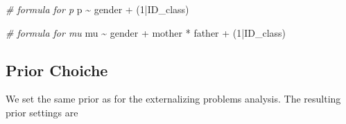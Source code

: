 \documentclass[
]{book}
\newenvironment{Shaded}{\begin{snugshade}}{\end{snugshade}}
\newcommand{\CommentTok}[1]{\textcolor[rgb]{0.56,0.35,0.01}{\textit{#1}}}
\newcommand{\DecValTok}[1]{\textcolor[rgb]{0.00,0.00,0.81}{#1}}
\newcommand{\NormalTok}[1]{#1}
\newcommand{\SpecialCharTok}[1]{\textcolor[rgb]{0.00,0.00,0.00}{#1}}
\begin{document}
\begin{Shaded}
\begin{Highlighting}[]
\CommentTok{\# formula for p}
\NormalTok{p }\SpecialCharTok{\textasciitilde{}}\NormalTok{ gender }\SpecialCharTok{+}\NormalTok{ (}\DecValTok{1}\SpecialCharTok{|}\NormalTok{ID\_class)}

\CommentTok{\# formula for mu}
\NormalTok{mu }\SpecialCharTok{\textasciitilde{}}\NormalTok{ gender }\SpecialCharTok{+}\NormalTok{ mother }\SpecialCharTok{*}\NormalTok{ father }\SpecialCharTok{+}\NormalTok{ (}\DecValTok{1}\SpecialCharTok{|}\NormalTok{ID\_class)}
\end{Highlighting}
\end{Shaded}

\hypertarget{prior-choiche-1}{%
\subsection{Prior Choiche}\label{prior-choiche-1}}

We set the same prior as for the externalizing problems analysis. The resulting prior settings are
\end{document}
